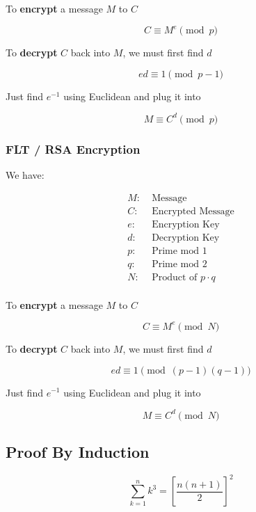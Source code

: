\documentclass[../../Main.tex]{subfiles}
\begin{document}
To \textbf{encrypt} a message $M$ to $C$

$$C \equiv M^e \pmod{p}$$

To \textbf{decrypt} $C$ back into $M$, we must first find $d$

$$ed \equiv 1 \pmod{p - 1}$$

Just find $e^{-1}$ using Euclidean and plug it into

$$M \equiv C^d \pmod{p}$$

\subsubsection{FLT / RSA Encryption}

We have:

\begin{align*}
    M: &\; \text{Message} \\
    C: &\; \text{Encrypted Message} \\
    e: &\; \text{Encryption Key} \\
    d: &\; \text{Decryption Key} \\
    p: &\; \text{Prime mod 1} \\
    q: &\; \text{Prime mod 2} \\
    N: &\; \text{Product of } p \cdot q \\
\end{align*}

To \textbf{encrypt} a message $M$ to $C$

$$C \equiv M^e \pmod{N}$$

To \textbf{decrypt} $C$ back into $M$, we must first find $d$

$$ed \equiv 1 \pmod{(p - 1)(q - 1)}$$

Just find $e^{-1}$ using Euclidean and plug it into

$$M \equiv C^d \pmod{N}$$

\subsection{Proof By Induction}

$$\sum_{k = 1}^{n}k^3 = \left[ \frac{n (n + 1)}{2}\right]^2$$
\end{document}
